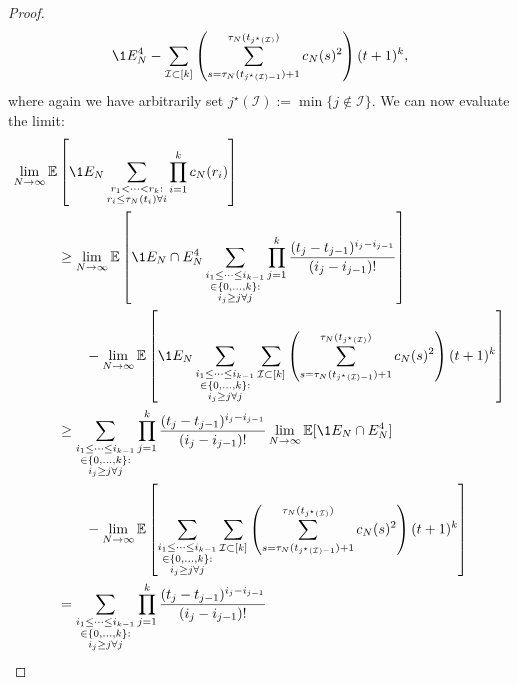 \begin{proof}
\begin{align*}
        \1{E_N^4}
        - \sum_{\mathcal{I} \subset [k]} 
        \left( \sum_{s=\tau_N(t_{j^\star(\mathcal{I})-1})+1}
        ^{\tau_N(t_{j^\star(\mathcal{I})})} c_N(s)^2 \right)
        ( t+1 )^k ,
\end{align*}
where again we have arbitrarily set 
$j^\star(\mathcal{I}) := \min\{j \notin \mathcal{I} \}$.
We can now evaluate the limit:
\begin{align*}
\lim_{N\to\infty} \E &\left[ \1{E_N} \sum_{\substack{r_1<\dots<r_k :\\ 
        r_i\leq \tau_N(t_i) \forall i}} \prod_{i=1}^k c_N(r_i) \right] \\
&\geq \lim_{N\to\infty} \E \left[ \1{E_N \cap E_N^4} 
        \sum_{\substack{i_1\leq \dots\leq i_{k-1}\\ \in \{0,\dots,k\} 
        :\\ i_j \geq j \forall j}}
        \prod_{j=1}^k \frac{(t_j - t_{j-1})^{i_j - i_{j-1}}}{(i_j - i_{j-1})!} \right] 
        \notag\\
    &\qquad- \lim_{N\to\infty} \E \left[ \1{E_N} 
        \sum_{\substack{i_1\leq \dots\leq i_{k-1}\\ \in \{0,\dots,k\} 
        :\\ i_j \geq j \forall j}}
        \sum_{\mathcal{I} \subset [k]} 
        \left( \sum_{s=\tau_N(t_{j^\star(\mathcal{I}) -1})+1}
        ^{\tau_N(t_{j^\star(\mathcal{I}) })} c_N(s)^2 \right)
        ( t+1 )^k \right] \notag\\
&\geq \sum_{\substack{i_1\leq \dots\leq i_{k-1}\\ \in \{0,\dots,k\} 
        :\\ i_j \geq j \forall j}}
        \prod_{j=1}^k \frac{(t_j - t_{j-1})^{i_j - i_{j-1}}}{(i_j - i_{j-1})!}   
        \lim_{N\to\infty}\E[\1{E_N \cap E_N^4}] \notag\\
    &\qquad- \lim_{N\to\infty} \E \left[ 
        \sum_{\substack{i_1\leq \dots\leq i_{k-1}\\ \in \{0,\dots,k\} 
        :\\ i_j \geq j \forall j}}
        \sum_{\mathcal{I} \subset [k]} 
        \left( \sum_{s=\tau_N(t_{j^\star(\mathcal{I}) -1})+1}
        ^{\tau_N(t_{j^\star(\mathcal{I}) })} c_N(s)^2 \right)
        ( t+1 )^k \right] \notag\\
&= \sum_{\substack{i_1\leq \dots\leq i_{k-1}\\ \in \{0,\dots,k\} 
        :\\ i_j \geq j \forall j}}
        \prod_{j=1}^k \frac{(t_j - t_{j-1})^{i_j - i_{j-1}}}{(i_j - i_{j-1})!}   

\end{align*}
\end{proof}
